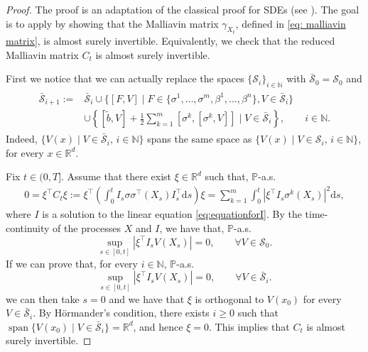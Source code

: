 \documentclass[11pt,a4paper]{article}
\newcommand{\R}{\mathbb{R}}
\newcommand{\rd}{\mathrm{d}}
\theoremstyle{plain}
\begin{document}
\begin{proof}
    The proof is an adaptation of the classical proof for SDEs (see \cite[Theorem 2.3.2]{nualart2006malliavin}). The goal is to apply \cite[Theorem 2.1.2]{nualart2006malliavin} by showing that the Malliavin matrix $\gamma_{X_t}$, defined in \eqref{eq: malliavin matrix}, is almost surely invertible. Equivalently, we check that the reduced Malliavin matrix $C_t$ is almost surely invertible. 

    First we notice that we can actually replace the spaces $\{\mathcal{S}_i\}_{i\in\mathbb{N}}$ with $\bar{\mathcal{S}}_0 = \mathcal{S}_0$ and
    \begin{align} 
    \label{eq: def of bar S spaces}
    \begin{aligned}
    \bar{\mathcal{S}}_{i+1} := &\bar{\mathcal{S}}_{i} \cup
    \{
        [F,V] \mid F\in\{\sigma^1,\dots,\sigma^m,\beta^1,\dots,\beta^n\},
        V\in \bar{\mathcal{S}}_{i}
    \}\\
    &\cup
    \left\{
    [\tilde b,V] + \frac{1}{2}\sum_{k=1}^m [\sigma^k,[\sigma^k,V]] \mid V \in \bar{\mathcal{S}}_{i}
    \right\},
    \qquad
    i\in \mathbb{N}.
    \end{aligned}
\end{align}
    Indeed, $\{V(x) \mid V\in\bar{\mathcal{S}}_i, \, i \in \mathbb{N} \}$ spans the same space as $\{V(x) \mid V\in\mathcal{S}_i, \, i \in  \mathbb{N}\}$, for every $x\in\R^d$.
    
    Fix $t \in (0,T]$. Assume that there exist $\xi \in \R^d$ such that, $\mathbb{P}$-a.s.
    \begin{align*}
        0=\xi^{\top} C_t \xi
        :=\xi^{\top}\left(
        \int_0^t I_s \sigma\sigma^{\top}(X_s)I_s^{\top} \rd s
        \right)\xi
        = \sum_{k=1}^{m} \int_0^t |\xi^{\top} I_s \sigma^k(X_s)|^2 \rd s,
    \end{align*}
    where $I$ is a solution to the linear equation \eqref{eq:equationforI}. By the time-continuity of the processes $X$ and $I$, we have that, $\mathbb{P}$-a.s.
    \begin{equation*}
        \sup_{s\in[0,t]}|\xi^{\top} I_s V(X_s)| = 0,
        \qquad
        \forall V \in \mathcal{S}_0.
    \end{equation*}
    If we can prove that, for every $i\in \mathbb{N}$, $\mathbb{P}$-a.s.
    \begin{equation}
    \label{eq: supremum zero}
        \sup_{s\in[0,t]}|\xi^{\top} I_s V(X_s)| = 0,
        \qquad
        \forall V \in \bar{\mathcal{S}}_i.
    \end{equation}
    we can then take $s=0$ and we have that $\xi$ is orthogonal to $V(x_0)$ for every $V\in \bar{\mathcal{S}}_i$. By H\"ormander's condition, there exists $i\geq 0$ such that $\operatorname{span}\{V(x_0) \mid V\in \bar{\mathcal{S}}_i\} = \R^d$, and hence $\xi = 0$. This implies that $C_t$ is almost surely invertible.


\end{proof}
\end{document}
